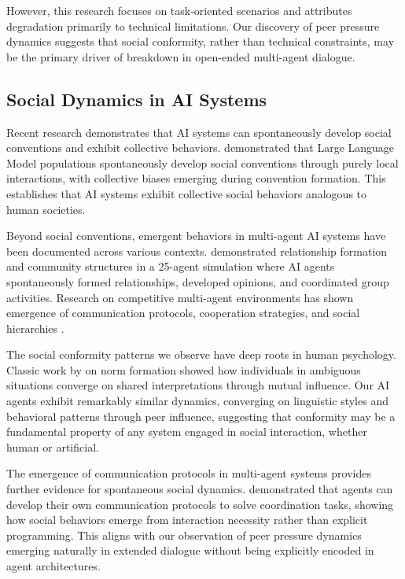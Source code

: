 \documentclass[11pt,letterpaper]{article}
\begin{document}
However, this research focuses on task-oriented scenarios and attributes degradation primarily to technical limitations. Our discovery of peer pressure dynamics suggests that social conformity, rather than technical constraints, may be the primary driver of breakdown in open-ended multi-agent dialogue.

\subsection{Social Dynamics in AI Systems}

Recent research demonstrates that AI systems can spontaneously develop social conventions and exhibit collective behaviors. \citet{ashery2025emergent} demonstrated that Large Language Model populations spontaneously develop social conventions through purely local interactions, with collective biases emerging during convention formation. This establishes that AI systems exhibit collective social behaviors analogous to human societies.

Beyond social conventions, emergent behaviors in multi-agent AI systems have been documented across various contexts. \citet{park2023generative} demonstrated relationship formation and community structures in a 25-agent simulation where AI agents spontaneously formed relationships, developed opinions, and coordinated group activities. Research on competitive multi-agent environments has shown emergence of communication protocols, cooperation strategies, and social hierarchies \citep{liang2020emergent,lu2023adversarial}.

The social conformity patterns we observe have deep roots in human psychology. Classic work by \citet{sherif1936psychology} on norm formation showed how individuals in ambiguous situations converge on shared interpretations through mutual influence. Our AI agents exhibit remarkably similar dynamics, converging on linguistic styles and behavioral patterns through peer influence, suggesting that conformity may be a fundamental property of any system engaged in social interaction, whether human or artificial.

The emergence of communication protocols in multi-agent systems provides further evidence for spontaneous social dynamics. \citet{foerster2016learning} demonstrated that agents can develop their own communication protocols to solve coordination tasks, showing how social behaviors emerge from interaction necessity rather than explicit programming. This aligns with our observation of peer pressure dynamics emerging naturally in extended dialogue without being explicitly encoded in agent architectures.
\end{document}
